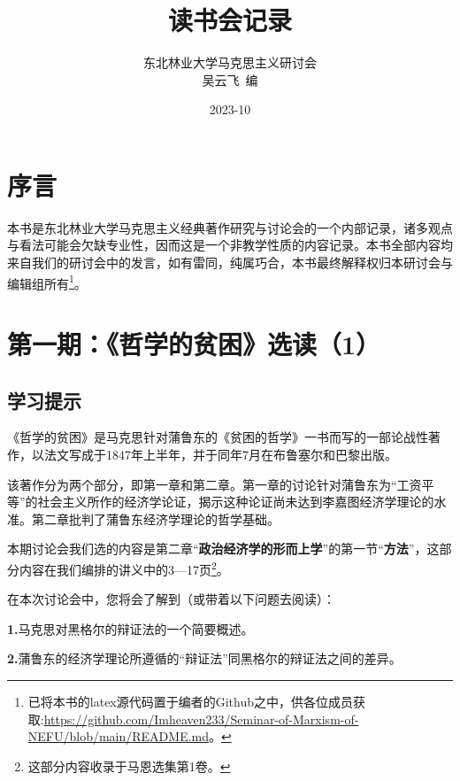 \documentclass[a4paper,twoside,12pt,AutoFakeBold]{ctexart}
\title{读书会记录}
\author{东北林业大学马克思主义研讨会\\
 吴云飞~编}
\date{2023-10}
\begin{document}
\maketitle
\newpage



\tableofcontents%

\newpage

\section{序言}

\begin{adjustwidth}{2em}{2em}
\qquad\fangsong 
本书是东北林业大学马克思主义经典著作研究与讨论会的一个内部记录，诸多观点与看法可能会欠缺专业性，因而这是一个非教学性质的内容记录。本书全部内容均来自我们的研讨会中的发言，如有雷同，纯属巧合，本书最终解释权归本研讨会与编辑组所有\footnote{已将本书的latex源代码置于编者的Github之中，供各位成员获取:\url{https://github.com/Imheaven233/Seminar-of-Marxism-of-NEFU/blob/main/README.md}。}。

\end{adjustwidth}




\newpage

\section{第一期：《哲学的贫困》选读（1）}

\subsection{学习提示}

《哲学的贫困》是马克思针对蒲鲁东的《贫困的哲学》一书而写的一部论战性著作，以法文写成于1847年上半年，并于同年7月在布鲁塞尔和巴黎出版。

该著作分为两个部分，即第一章和第二章。第一章的讨论针对蒲鲁东为“工资平等”的社会主义所作的经济学论证，揭示这种论证尚未达到李嘉图经济学理论的水准。第二章批判了蒲鲁东经济学理论的哲学基础。

本期讨论会我们选的内容是第二章“\textbf{政治经济学的形而上学}”的第一节“\textbf{方法}”，这部分内容在我们编排的讲义中的3—17页\footnote{这部分内容收录于马恩选集第1卷。}。

在本次讨论会中，您将会了解到（或带着以下问题去阅读）：

\textbf{1.}马克思对黑格尔的辩证法的一个简要概述。

\textbf{2.}蒲鲁东的经济学理论所遵循的“辩证法”同黑格尔的辩证法之间的差异。
\end{document}
